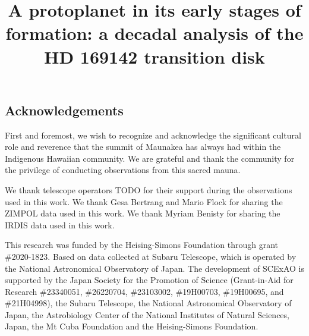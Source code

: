 \documentclass[twocolumn]{aastex631}
\begin{document}
\begin{CJK*}{UTF8}{gbsn}

\title{A protoplanet in its early stages of formation: a decadal analysis of the HD 169142 transition disk}



\begin{abstract}
\end{abstract}







\section*{Acknowledgements}
First and foremost, we wish to recognize and acknowledge the significant cultural role and reverence that the summit of Maunakea has always had within the Indigenous Hawaiian community. We are grateful and thank the community for the privilege of conducting observations from this sacred mauna.

We thank telescope operators TODO for their support during the observations used in this work. We thank Gesa Bertrang and Mario Flock for sharing the ZIMPOL data used in this work. We thank Myriam Benisty for sharing the IRDIS data used in this work.

This research was funded by the Heising-Simons Foundation through grant \#2020-1823. Based on data collected at Subaru Telescope, which is operated by the National Astronomical Observatory of Japan. The development of SCExAO is supported by the Japan Society for the Promotion of Science (Grant-in-Aid for Research \#23340051, \#26220704, \#23103002, \#19H00703, \#19H00695, and \#21H04998), the Subaru Telescope, the National Astronomical Observatory of Japan, the Astrobiology Center of the National Institutes of Natural Sciences, Japan, the Mt Cuba Foundation and the Heising-Simons Foundation.



\end{CJK*}
\end{document}
